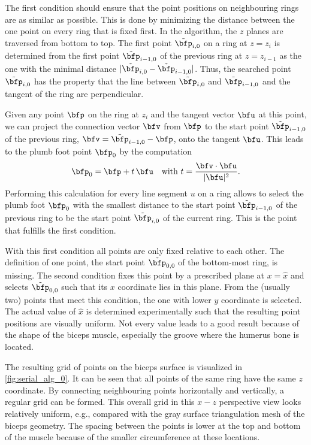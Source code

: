 The first condition should ensure that the point positions on neighbouring rings are as similar as possible. This is done by minimizing the distance between the one point on every ring that is fixed first.
In the algorithm, the $z$ planes are traversed from bottom to top. 
The first point $\tilde{\bfp}_{i,0}$ on a ring at $z=z_i$ is determined from the first point $\tilde{\bfp}_{i-1,0}$ of the previous ring at $z=z_{i-1}$ as the one with the minimal distance $|\tilde{\bfp}_{i,0} - \tilde{\bfp}_{i-1,0}|$. 
Thus, the searched point $\tilde{\bfp}_{i,0}$ has the property that the line between $\tilde{\bfp}_{i,0}$ and $\tilde{\bfp}_{i-1,0}$ and the tangent of the ring are perpendicular.

Given any point $\bfp$ on the ring at $z_i$ and the tangent vector $\bfu$ at this point, we can project the connection vector $\bfv$ from $\bfp$ to the start point $\tilde{\bfp}_{i-1,0}$ of the previous ring, $\bfv = \tilde{\bfp}_{i-1,0} - \bfp$, onto the tangent $\bfu$. This leads to the plumb foot point $\bfp_0$ by the computation
\begin{equation*}
  \begin{array}{lll}
    \bfp_0 = \bfp + t\,\bfu \quad \text{with }t = \dfrac{\bfv \cdot \bfu}{|\bfu|^2}.
  \end{array}
\end{equation*}
Performing this calculation for every line segment $u$ on a ring allows to select the plumb foot $\bfp_0$ with the smallest distance to the start point $\tilde{\bfp}_{i-1,0}$ of the previous ring to be the start point $\tilde{\bfp}_{i,0}$ of the current ring. This is the point that fulfills the first condition.

With this first condition all points are only fixed relative to each other. The definition of one point, the start point $\tilde{\bfp}_{0,0}$ of the bottom-most ring, is missing. The second condition fixes this point by a prescribed plane at $x = \hat{x}$ and selects $\tilde{\bfp}_{0,0}$ such that its $x$ coordinate lies in this plane. From the (usually two) points that meet this condition, the one with lower $y$ coordinate is selected. The actual value of $\hat{x}$ is determined experimentally such that the resulting point positions are visually uniform. Not every value leads to a good result because of the shape of the biceps muscle, especially the groove where the humerus bone is located.

The resulting grid of points on the biceps surface is visualized in \cref{fig:serial_alg_0}. It can be seen that all points of the same ring have the same $z$ coordinate. By connecting neighbouring points horizontally and vertically, a regular grid can be formed. This overall grid in this $x-z$ perspective view looks relatively uniform, e.g., compared with the gray surface triangulation mesh of the biceps geometry. The spacing between the points is lower at the top and bottom of the muscle because of the smaller circumference at these locations.

